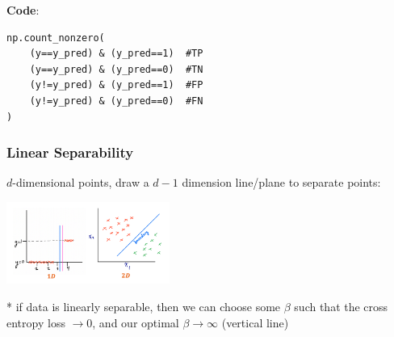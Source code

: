 \documentclass[8pt]{extarticle}
\begin{document}
\textbf{Code}:
\begin{verbatim}
np.count_nonzero(
    (y==y_pred) & (y_pred==1)  #TP
    (y==y_pred) & (y_pred==0)  #TN
    (y!=y_pred) & (y_pred==1)  #FP
    (y!=y_pred) & (y_pred==0)  #FN
)
\end{verbatim}

\subsubsection*{Linear Separability}
$d$-dimensional points, draw a $d-1$ dimension line/plane to separate points:\par
\includegraphics[width=0.4\textwidth]{separate}\par
* if data is linearly separable, then we can choose some $\beta$ such that the cross entropy loss $\rightarrow0$, and our optimal $\beta \rightarrow \infty$ (vertical line) \\ 
\hline
\end{document}
